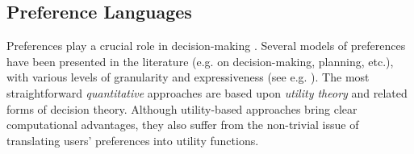 




\subsection{Preference Languages}
Preferences play a crucial role in decision-making \cite{Pigozzi2016}. Several models of preferences have been presented in the literature (e.g. on decision-making, planning, etc.), with various levels of granularity and expressiveness (see e.g. \cite{Domshlak2011}). The most straightforward \textit{quantitative} approaches are based upon \textit{utility theory} and related forms of decision theory. %
Although utility-based approaches bring clear computational advantages, they also suffer from the non-trivial issue of translating users' preferences into utility functions. 

